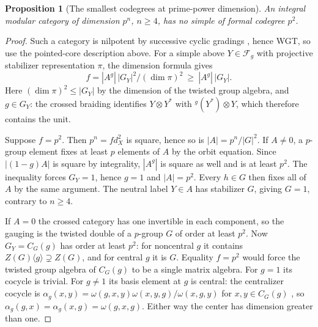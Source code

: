 \documentclass[11pt,a4paper]{article}
\numberwithin{equation}{section}
\newtheorem{proposition}[theorem]{Proposition}
\theoremstyle{remark}
\begin{document}
\begin{proposition}[The smallest codegrees at prime-power dimension]\label{fam:M:13.4}
\label{prop:prime-power-no-defect-two}
An integral modular category of dimension $p^n$, $n\ge4$, has no
simple of formal codegree $p^2$.
\end{proposition}
\begin{proof}
Such a category is nilpotent by successive cyclic gradings \cite[Theorem~8.28]{ENOannals}, hence WGT, so use
the pointed-core description above. For a simple above
$Y\in\mathcal F_g$ with projective stabilizer representation $\pi$,
the dimension formula gives
\[
 f=|A^g|\,|G_Y|^2/(\dim\pi)^2\ \ge\ |A^g|\,|G_Y|.
\]
Here $(\dim\pi)^2\le |G_Y|$ by the dimension of the twisted group
algebra, and $g\in G_Y$: the crossed braiding identifies
$Y\otimes Y^*$ with ${}^g(Y^*)\otimes Y$, which therefore contains
the unit.

Suppose $f=p^2$. Then $p^n=f d_X^2$ is square, hence so is
$|A|=p^n/|G|^2$. If $A\ne0$, a $p$-group element fixes at least
$p$ elements of $A$ by the orbit equation. Since $|(1-g)A|$ is
square by integrality, $|A^g|$ is square as well and is at least
$p^2$. The inequality forces $G_Y=1$, hence $g=1$ and $|A|=p^2$.
Every $h\in G$ then fixes all of $A$ by the same argument. The
neutral label $Y\in A$ has stabilizer $G$, giving $G=1$, contrary
to $n\ge4$.

If $A=0$ the crossed category has one invertible in each component,
so the gauging is the twisted double of a $p$-group $G$ of order
at least $p^2$. Now $G_Y=C_G(g)$ has order at least $p^2$: for
noncentral $g$ it contains $Z(G)\langle g\rangle\supsetneq Z(G)$,
and for central $g$ it is $G$.
Equality $f=p^2$ would force the twisted group algebra of $C_G(g)$
to be a single matrix algebra. For $g=1$ its cocycle is trivial.
For $g\ne1$ its basis element at $g$ is central: the centralizer cocycle is $\alpha_g(x,y)=\omega(g,x,y)\omega(x,y,g)/\omega(x,g,y)$ for $x,y\in C_G(g)$ \cite[(8.1)]{NP}, so $\alpha_g(g,x)=\alpha_g(x,g)=\omega(g,x,g)$. Either way the center has dimension greater
than one.
\end{proof}
\end{document}
